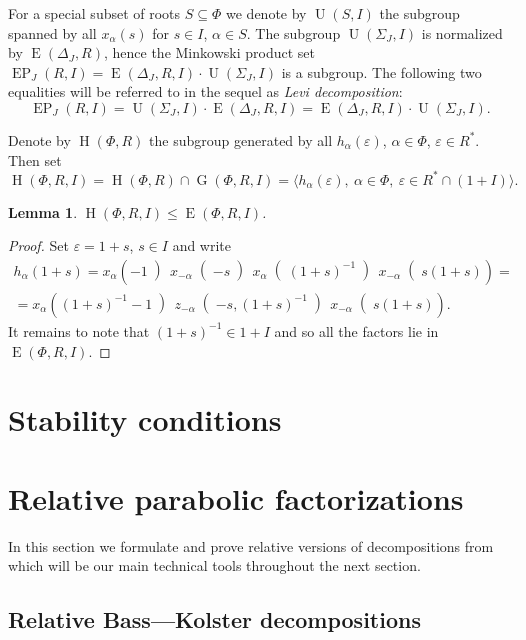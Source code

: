 \documentclass[12pt]{amsart}
\numberwithin{equation}{section}
\newtheorem{lemma}[lemmacounter]{Lemma}
\theoremstyle{definition}
\DeclareMathOperator{\G}{G}
\DeclareMathOperator{\E}{E}
\DeclareMathOperator{\EP}{EP}
\DeclareMathOperator{\Hh}{H}
\DeclareMathOperator{\U}{U}
\begin{document}
For a special subset of roots $S\subseteq \Phi$ we denote by $\U(S, I)$ the subgroup spanned by all $x_{\alpha}(s)$ for $s\in I$, $\alpha\in S$.
The subgroup $\U(\Sigma_J, I)$ is normalized by $\E(\Delta_J, R)$, hence the Minkowski product set $\EP_J(R, I) = \E(\Delta_J, R, I) \cdot \U(\Sigma_J, I)$ is a subgroup. 
The following two equalities will be referred to in the sequel as {\it Levi decomposition}: 
\[ \EP_J(R, I) = \U(\Sigma_J, I) \cdot \E(\Delta_J, R, I) = \E(\Delta_J, R, I) \cdot \U(\Sigma_J, I). \]

Denote by $\Hh(\Phi,R)$ the subgroup generated by all $h_\alpha(\varepsilon)$, $\alpha\in\Phi$, $\varepsilon\in R^*$. Then set
\[ \Hh(\Phi,R,I) = \Hh(\Phi,R)\cap\G(\Phi,R,I)=\langle h_\alpha(\varepsilon),\ \alpha\in\Phi,\ \varepsilon\in R^*\cap(1+I)\rangle. \]
\begin{lemma}
$\Hh(\Phi,R,I)\leqslant\E(\Phi,R,I)$.
\end{lemma}
\begin{proof}
Set $\varepsilon=1+s$, $s\in I$ and write
\begin{multline*}
h_\alpha(1+s) = x_\alpha\left(-1\middle)\, x_{-\alpha}\middle(-s\middle)\, x_\alpha\middle((1+s)^{-1}\middle)\, x_{-\alpha}\middle(s(1+s)\right) = \\
= x_\alpha\left((1+s)^{-1}-1\middle)\, z_{-\alpha}\middle(-s,(1+s)^{-1}\middle)\, x_{-\alpha}\middle(s(1+s)\right).
\end{multline*}
It remains to note that $(1+s)^{-1}\in 1+I$ and so all the factors lie in $\E(\Phi,R,I)$.
\end{proof}

\section{Stability conditions}\label{sec:stability-conditions}


\section{Relative parabolic factorizations} \label{sec:factorizations}
In this section we formulate and prove relative versions of decompositions from~\cite{St78} which will be our main technical tools throughout the next section.

\subsection{Relative Bass---Kolster decompositions}\label{sec:bass-kolster}

\end{document}
